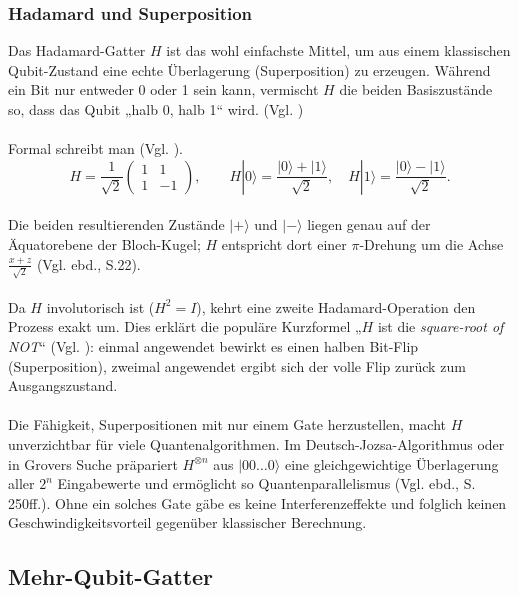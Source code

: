 \subsubsection{Hadamard und Superposition}\label{subsubsec:hadamard_superposition}

Das Hadamard-Gatter $H$ ist das wohl einfachste Mittel, um aus einem klassischen Qubit-Zustand eine echte Überlagerung (Superposition) zu erzeugen.  Während ein Bit nur entweder 0 oder 1 sein kann, vermischt $H$ die beiden Basiszustände so, dass das Qubit  „halb 0, halb 1“ wird. (Vgl. \cite[S.19f.]{nielsen_quantum_2010})\\
\\
Formal schreibt man (Vgl. \cite[S.76]{rieffel_quantum_2011}).
\\
\begin{equation}
  H = \frac1{\sqrt2}\!
  \begin{pmatrix} 1 & 1 \\ 1 & -1 \end{pmatrix},
  \qquad
  H|0\rangle=\frac{|0\rangle+|1\rangle}{\sqrt2},
  \quad
  H|1\rangle=\frac{|0\rangle-|1\rangle}{\sqrt2}.
\end{equation}
\\
Die beiden resultierenden Zustände $|+\rangle$ und $|-\rangle$ liegen genau auf der Äquatorebene der Bloch-Kugel; $H$ entspricht dort einer $\pi$-Drehung um die Achse $\tfrac{x+z}{\sqrt2}$ (Vgl. ebd., S.22).\\
\\
Da $H$ involutorisch ist ($H^2=I$), kehrt eine zweite Hadamard-Operation den Prozess exakt um.  Dies erklärt die populäre Kurzformel „$H$ ist die \emph{square-root of NOT}“ (Vgl. \cite[S.19f.]{nielsen_quantum_2010}): einmal angewendet bewirkt es einen halben Bit-Flip (Superposition), zweimal angewendet ergibt sich der volle Flip zurück zum Ausgangszustand.\\
\\
Die Fähigkeit, Superpositionen mit nur einem Gate herzustellen, macht $H$ unverzichtbar für viele Quantenalgorithmen.  Im Deutsch-Jozsa-Algorithmus oder in Grovers Suche präpariert $H^{\otimes n}$ aus $|00\ldots0\rangle$ eine gleichgewichtige Überlagerung aller $2^{n}$ Eingabewerte und ermöglicht so Quantenparallelismus (Vgl. ebd., S. 250ff.).  Ohne ein solches Gate gäbe es keine Interferenzeffekte und folglich keinen Geschwindigkeitsvorteil gegenüber klassischer Berechnung.

\subsection{Mehr-Qubit-Gatter}



